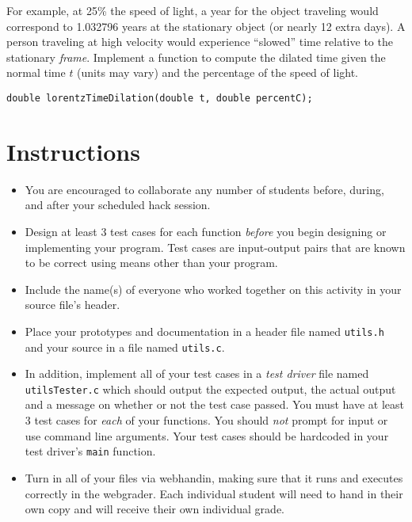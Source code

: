 \documentclass[12pt]{scrartcl}
\begin{document}
\begin{enumerate}
  For example, at 25\% the speed of light, a year for the object 
  traveling would correspond to 1.032796 years at the stationary object 
  (or nearly 12 extra days).   A person traveling at high velocity 
  would experience ``slowed'' time
  relative to the stationary \emph{frame}.  Implement a function to 
  compute the dilated time given the normal time $t$ (units may vary)
  and the percentage of the speed of light.
\begin{verbatim}
double lorentzTimeDilation(double t, double percentC);
\end{verbatim}

\end{enumerate}  

\section*{Instructions}

\begin{itemize}
  \item You are encouraged to collaborate any number of students 
  before, during, and after your scheduled hack session.  
  \item Design at least 3 test cases for each function
  \emph{before} you begin
  designing or implementing your program.  Test cases are 
  input-output pairs that are known to be correct using means
  other than your program.
  \item Include the name(s) of everyone who worked together on
  this activity in your source file's header.
  \item Place your prototypes and documentation in a header file 
  named \texttt{utils.h} and your source in a file
  named \texttt{utils.c}.
  \item In addition, implement all of your test cases in a
  \emph{test driver} file named \texttt{utilsTester.c}
  which should output the expected output, the actual output and
  a message on whether or not the test case passed.  You must have
  at least 3 test cases for \emph{each} of your functions.
  You should \emph{not} prompt for input or use command line 
  arguments.  Your test cases should be hardcoded in your test 
  driver's \texttt{main} function.  
  \item Turn in all of your files via webhandin, making sure that 
  it runs and executes correctly in the webgrader.  Each individual 
  student will need to hand in their own copy and will receive 
  their own individual grade.
\end{itemize}
  
\end{document}
